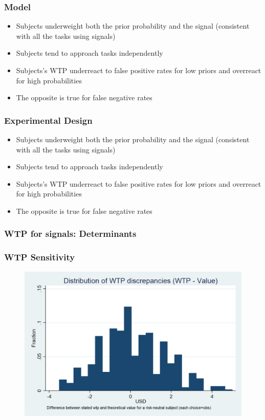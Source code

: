 \documentclass[11pt,hyperref={bookmarks=false}]{beamer}
\begin{document}
\begin{frame}
\frametitle{Model}
\begin{itemize}
\item Subjects underweight both the prior probability and the signal (consistent with all the tasks using signals)
\item Subjects tend to approach tasks independently
\item Subjects's WTP underreact to false positive rates for low priors and overreact for high probabilities
\item The opposite is true for false negative rates
\end{itemize}
\end{frame}



\begin{frame}
\frametitle{Experimental Design}
\begin{itemize}
\item Subjects underweight both the prior probability and the signal (consistent with all the tasks using signals)
\item Subjects tend to approach tasks independently
\item Subjects's WTP underreact to false positive rates for low priors and overreact for high probabilities
\item The opposite is true for false negative rates
\end{itemize}
\end{frame}



\begin{frame}
\frametitle{WTP for signals: Determinants}
\footnotesize


\end{frame}


\begin{frame}
\frametitle{WTP Sensitivity}
\begin{figure}[h]
\includegraphics[scale=0.3]{Graphs/hist_WTP_discr1.png}
\end{figure}
\end{frame}
\end{document}
